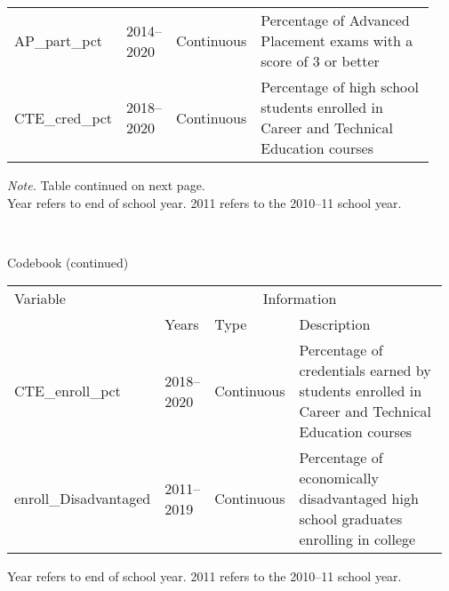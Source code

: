 \begin{threeparttable}
\begin{tabular}{ p{0.2\linewidth} p{0.115\linewidth} p{0.13\linewidth} p{0.49\linewidth}}
AP\_part\_pct                        &   2014--2020     &  Continuous  &  Percentage of Advanced Placement exams with a score of 3 or better              \\ 
CTE\_cred\_pct                       &   2018--2020     &  Continuous  &  Percentage of high school students enrolled in Career and Technical Education courses              \\ 
\midrule
\end{tabular}
\begin{tablenotes}
    { 
        \textit{Note.} Table continued on next page.\\
        \small
         Year refers to end of school year. 2011 refers to the 2010--11 school year. 
    
     }
\end{tablenotes}
\end{threeparttable}
\\
\begin{threeparttable}
    \renewcommand\thetable{1}
    \caption{Codebook (continued)} %
\label{tab:codebook2} %
    \begin{tabular}{ p{0.23\linewidth} p{0.115\linewidth} p{0.13\linewidth} p{0.49\linewidth}}     %
    \toprule %
    Variable                        & \multicolumn{3}{c}{Information} \\ %

                       \cmidrule(r){2-4} %
                                    &   Years    &    Type     &  Description \\ 
\midrule
CTE\_enroll\_pct                     &   2018--2020     &  Continuous  &  Percentage of credentials earned by students enrolled in Career and Technical Education courses              \\ 
enroll\_Disadvantaged                &   2011--2019     &  Continuous  &  Percentage of economically disadvantaged high school graduates enrolling in college             \\ 
\midrule
\end{tabular}
\begin{tablenotes}
    {\small
         Year refers to end of school year. 2011 refers to the 2010--11 school year. 
    
     }
\end{tablenotes}
\end{threeparttable}